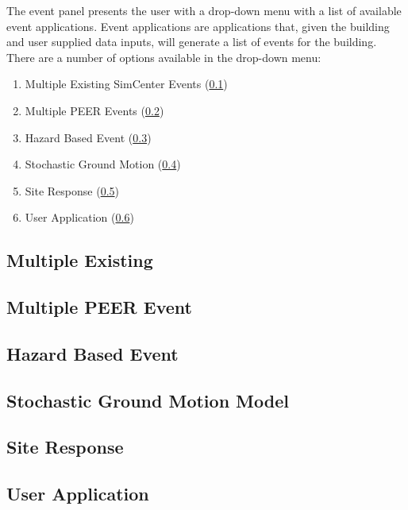 The event panel presents the user with a drop-down menu with a list of
available event applications. Event applications are applications
that, given the building and user supplied data inputs, will generate
a list of events for the building. There are a number of options
available in the drop-down menu:

\begin{enumerate}
\item Multiple Existing SimCenter Events (\ref{subsec:multiple_existing})
\item Multiple PEER Events (\ref{subsec:multiple_peer})
\item Hazard Based Event (\ref{subsec:hazard_based})
\item Stochastic Ground Motion (\ref{subsec:stochastic_motions})
\item Site Response (\ref{subsec:site_response})
\item User Application (\ref{subsec:user_event})
\end{enumerate}

\subsection{Multiple Existing}
\label{subsec:multiple_existing}


\subsection{Multiple PEER Event}
\label{subsec:multiple_peer}


\subsection{Hazard Based Event}
\label{subsec:hazard_based}


\subsection{Stochastic Ground Motion Model}
\label{subsec:stochastic_motions}


\subsection{Site Response}
\label{subsec:site_response}


\subsection{User Application}
\label{subsec:user_event}

